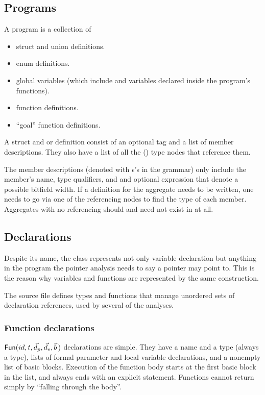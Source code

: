 \begin{docpart}
\subsection{Programs}
A program is a collection of
\begin{itemize}
\item struct and union definitions.
\item enum definitions.
\item global variables (which include  and 
        variables declared inside the \ansiC program's functions).
\item function definitions.
\item ``goal'' function definitions.
\end{itemize}

A struct and or definition consist of an optional tag and a list
of member descriptions. They also have a list of all the ()
type nodes that reference them.

The member descriptions (denoted with $\epsilon$'s in the grammar)
only include the member's name, type qualifiers, and and optional
expression that denote a possible bitfield width.
If a definition for the aggregate needs to be written, one needs
to go via one of the referencing  nodes to find
the type of each member. Aggregates with no referencing
 should and need not exist in \coreC at all.

\subsection{Declarations}
Despite its name, the  class represents not only variable
declaration but anything in the program the pointer analysis needs to
say a pointer may point to. This is the reason why variables and
functions are represented by the same construction.

The source file  defines types and functions that
manage unordered sets of declaration references, used by several
of the analyses.

\subsubsection{Function declarations}

$\textsf{Fun}(id,t,\vec d_p,\vec d_e,\vec b\,)$
declarations are simple. They have a name and a type (always
a  type),
lists of formal parameter and local variable declarations, and a
nonempty list of basic blocks. Execution of the function body starts
at the first basic block in the list, and always ends with an
explicit  statement. Functions cannot return simply
by ``falling through the body''.


\end{docpart}
